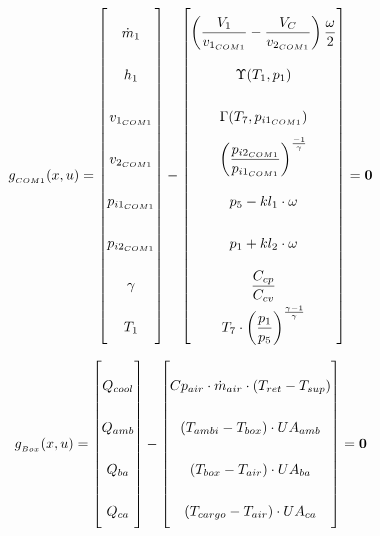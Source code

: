 
\begin{equation} \label{eq:Gcs1}\renewcommand{\arraystretch}{2.5}
	g_{_{COM1}}(x,u) =  \begin{bmatrix}
		\dot{m}_1     \\ %
		h_{1}         \\ %
		v_{1_{COM1}}  \\ %
		v_{2_{COM1}}  \\ %
		p_{i1_{COM1}} \\ %
		p_{i2_{COM1}} \\ %
		\gamma        \\ %
		T_{1}         \\ %
	\end{bmatrix}
	-
	\begin{bmatrix}
		\left(\dfrac{V_1}{v_{1_{COM1}}} - \dfrac{V_C}{v_{2_{COM1}}}\right) \dfrac{\omega}{2} \\ %
		\Upsilon(T_{1}, p_{1})                                                               \\ %
		\Gamma(T_{7},p_{i1_{COM1}})                                                          \\ %
		\left(\dfrac{p_{i2_{COM1}}}{p_{i1_{COM1}}}\right)^{\frac{-1}{\gamma}}                \\ %
		p_{5} - kl_1 \cdot \omega                                                            \\ %
		p_{1} + kl_2 \cdot \omega                                                            \\ %
		\dfrac{C_{cp}}{C_{cv}}                                                               \\ %
		T_{7}\cdot \left(\dfrac{p_{1}}{p_{5}}\right)^{\frac{\gamma-1}{\gamma}}               \\ %
	\end{bmatrix}
	=\textbf{0}
\end{equation}


\begin{equation} \label{eq:Gbox}\renewcommand{\arraystretch}{2.5}
	g_{_{Box}}(x,u) =  \begin{bmatrix}
		Q_{cool}		\\ %
		Q_{amb}			\\ %
		Q_{ba}			\\ %
		Q_{ca}			\\ %
	\end{bmatrix}
	-
	\begin{bmatrix}
		Cp_{air} \cdot \dot{m}_{air} \cdot (T_{ret} - T_{sup})  \\	%
		(T_{ambi} - T_{box}) \cdot U A_{amb} 					\\	%
		(T_{box} - T_{air}) \cdot U A_{ba} 						\\	%
		(T_{cargo} - T_{air}) \cdot U A_{ca}				 	\\	%
	\end{bmatrix}
	=\textbf{0}
\end{equation}



